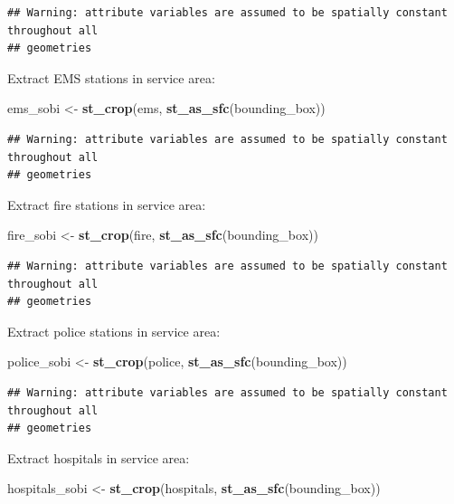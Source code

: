 \documentclass[
]{article}
\newenvironment{Shaded}{\begin{snugshade}}{\end{snugshade}}
\newcommand{\KeywordTok}[1]{\textcolor[rgb]{0.13,0.29,0.53}{\textbf{#1}}}
\newcommand{\NormalTok}[1]{#1}
\newcommand{\StringTok}[1]{\textcolor[rgb]{0.31,0.60,0.02}{#1}}
\begin{document}
\begin{verbatim}
## Warning: attribute variables are assumed to be spatially constant throughout all
## geometries
\end{verbatim}

Extract EMS stations in service area:

\begin{Shaded}
\begin{Highlighting}[]
\NormalTok{ems_sobi <-}\StringTok{ }\KeywordTok{st_crop}\NormalTok{(ems, }\KeywordTok{st_as_sfc}\NormalTok{(bounding_box))}
\end{Highlighting}
\end{Shaded}

\begin{verbatim}
## Warning: attribute variables are assumed to be spatially constant throughout all
## geometries
\end{verbatim}

Extract fire stations in service area:

\begin{Shaded}
\begin{Highlighting}[]
\NormalTok{fire_sobi <-}\StringTok{ }\KeywordTok{st_crop}\NormalTok{(fire, }\KeywordTok{st_as_sfc}\NormalTok{(bounding_box))}
\end{Highlighting}
\end{Shaded}

\begin{verbatim}
## Warning: attribute variables are assumed to be spatially constant throughout all
## geometries
\end{verbatim}

Extract police stations in service area:

\begin{Shaded}
\begin{Highlighting}[]
\NormalTok{police_sobi <-}\StringTok{ }\KeywordTok{st_crop}\NormalTok{(police, }\KeywordTok{st_as_sfc}\NormalTok{(bounding_box))}
\end{Highlighting}
\end{Shaded}

\begin{verbatim}
## Warning: attribute variables are assumed to be spatially constant throughout all
## geometries
\end{verbatim}

Extract hospitals in service area:

\begin{Shaded}
\begin{Highlighting}[]
\NormalTok{hospitals_sobi <-}\StringTok{ }\KeywordTok{st_crop}\NormalTok{(hospitals, }\KeywordTok{st_as_sfc}\NormalTok{(bounding_box))}
\end{Highlighting}
\end{Shaded}
\end{document}
